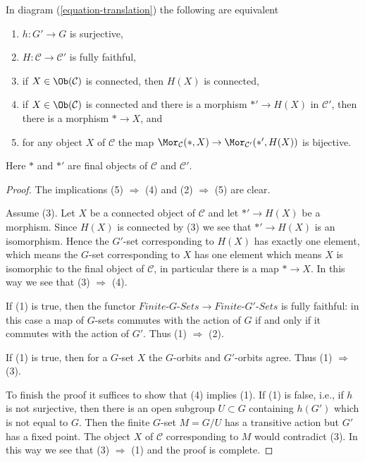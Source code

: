 \begin{lemma}
\label{lemma-functoriality-galois-surjective}
In diagram (\ref{equation-translation}) the following are equivalent
\begin{enumerate}
\item $h : G' \to G$ is surjective,
\item $H : \mathcal{C} \to \mathcal{C}'$ is fully faithful,
\item if $X \in \Ob(\mathcal{C})$ is connected, then $H(X)$ is connected,
\item if $X \in \Ob(\mathcal{C})$ is connected and there is
a morphism $*' \to H(X)$ in $\mathcal{C}'$, then
there is a morphism $* \to X$, and
\item for any object $X$ of $\mathcal{C}$ the map
$\Mor_\mathcal{C}(*, X) \to \Mor_{\mathcal{C}'}(*', H(X))$
is bijective.
\end{enumerate}
Here $*$ and $*'$ are final objects of $\mathcal{C}$ and $\mathcal{C}'$.
\end{lemma}

\begin{proof}
The implications (5) $\Rightarrow$ (4) and (2) $\Rightarrow$ (5) are clear.

\medskip\noindent
Assume (3). Let $X$ be a connected object of $\mathcal{C}$ and let
$*' \to H(X)$ be a morphism. Since $H(X)$ is connected by (3)
we see that $*' \to H(X)$ is an isomorphism. Hence the $G'$-set
corresponding to $H(X)$ has exactly one element, which means the
$G$-set corresponding to $X$ has one element which means $X$ is
isomorphic to the final object of $\mathcal{C}$, in particular
there is a map $* \to X$. In this way we see that (3) $\Rightarrow$ (4).

\medskip\noindent
If (1) is true, then the functor
$\textit{Finite-}G\textit{-Sets} \to \textit{Finite-}G'\textit{-Sets}$
is fully faithful: in this case a map of $G$-sets commutes with the
action of $G$ if and only if it commutes with the action of $G'$.
Thus (1) $\Rightarrow$ (2).

\medskip\noindent
If (1) is true, then for a $G$-set $X$ the $G$-orbits and $G'$-orbits
agree. Thus (1) $\Rightarrow$ (3).

\medskip\noindent
To finish the proof it suffices to show that (4) implies (1).
If (1) is false, i.e., if $h$ is not surjective, then there is
an open subgroup $U \subset G$ containing $h(G')$ which is not
equal to $G$. Then the finite $G$-set $M = G/U$ has a transitive
action but $G'$ has a fixed point. The object $X$ of $\mathcal{C}$
corresponding to $M$ would contradict (3). In this way we see that
(3) $\Rightarrow$ (1) and the proof is complete.
\end{proof}

